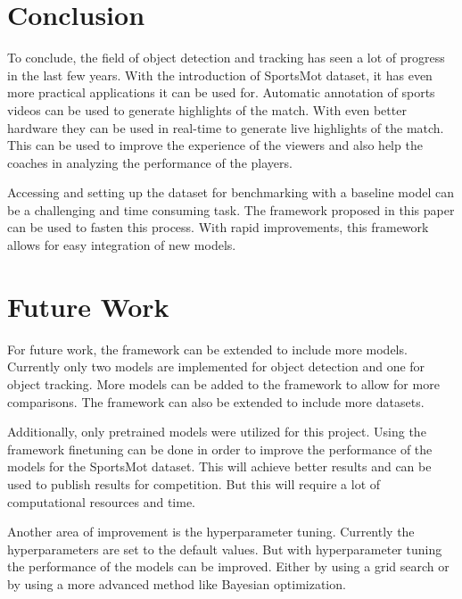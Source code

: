 \documentclass[runningheads]{llncs}
\begin{document}
\section{Conclusion}
To conclude, the field of object detection and tracking has seen a lot of progress in the last few years.
With the introduction of SportsMot dataset, it has even more practical applications it can be used for.
Automatic annotation of sports videos can be used to generate highlights of the match.
With even better hardware they can be used in real-time to generate live highlights of the match.
This can be used to improve the experience of the viewers and also help the coaches in analyzing the performance of the players.

Accessing and setting up the dataset for benchmarking with a baseline model can be a challenging and time consuming task.
The framework proposed in this paper can be used to fasten this process.
With rapid improvements, this framework allows for easy integration of new models.

\section{Future Work}
For future work, the framework can be extended to include more models.
Currently only two models are implemented for object detection and one for object tracking.
More models can be added to the framework to allow for more comparisons.
The framework can also be extended to include more datasets.

Additionally, only pretrained models were utilized for this project.
Using the framework finetuning can be done in order to improve the performance of the models for the SportsMot dataset.
This will achieve better results and can be used to publish results for competition.
But this will require a lot of computational resources and time.

Another area of improvement is the hyperparameter tuning.
Currently the hyperparameters are set to the default values.
But with hyperparameter tuning the performance of the models can be improved.
Either by using a grid search or by using a more advanced method like Bayesian optimization.

%
%


\nocite{*}
\end{document}

